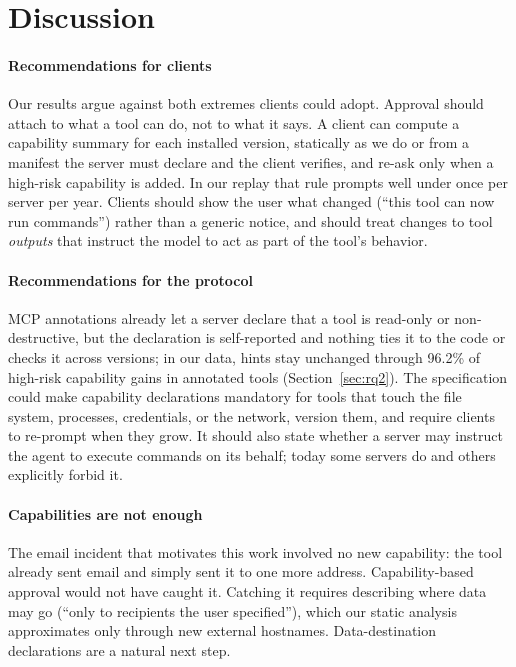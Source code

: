 \section{Discussion}\label{sec:discussion}

\paragraph{Recommendations for clients}
Our results argue against both extremes clients could adopt. Approval should attach to what a tool can do, not to what it says. A client can compute a capability summary for each installed version, statically as we do or from a manifest the server must declare and the client verifies, and re-ask only when a high-risk capability is added. In our replay that rule prompts well under once per server per year. Clients should show the user what changed (``this tool can now run commands'') rather than a generic notice, and should treat changes to tool \emph{outputs} that instruct the model to act as part of the tool's behavior.

\paragraph{Recommendations for the protocol}
MCP annotations already let a server declare that a tool is read-only or non-destructive, but the declaration is self-reported and nothing ties it to the code or checks it across versions; in our data, hints stay unchanged through 96.2\% of high-risk capability gains in annotated tools (Section~\ref{sec:rq2}). The specification could make capability declarations mandatory for tools that touch the file system, processes, credentials, or the network, version them, and require clients to re-prompt when they grow. It should also state whether a server may instruct the agent to execute commands on its behalf; today some servers do and others explicitly forbid it.

\paragraph{Capabilities are not enough}
The email incident that motivates this work involved no new capability: the tool already sent email and simply sent it to one more address. Capability-based approval would not have caught it. Catching it requires describing where data may go (``only to recipients the user specified''), which our static analysis approximates only through new external hostnames. Data-destination declarations are a natural next step.

